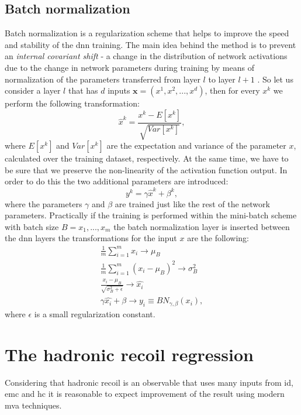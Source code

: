 \subsection{Batch normalization}
Batch normalization is a regularization scheme that helps to improve the speed and stability of the \gls{dnn} training. The main idea behind the method is to prevent an \textit{internal covariant shift} - a change in the distribution of network activations due to the change in network parameters during training by means of normalization of the parameters transferred from layer $l$ to layer $l+1$  \cite{batch_normalization}. So let us consider a layer $l$ that has $d$ inputs $\textbf{x}=(x^1,x^2,...,x^d)$, then for every $x^k$ we perform the following transformation:
\begin{equation}
\label{eq::bn1}
\hat{x}^k=\frac{x^k-E[x^k]}{\sqrt{Var[x^k]}},
\end{equation}
where $E[x^k]$ and $Var[x^k]$ are the expectation and variance of the parameter $x$, calculated over the training dataset, respectively. At the same time, we have to be sure that we preserve the non-linearity of the activation function output. In order to do this the two additional parameters are introduced:
\begin{equation}
\label{eq::bn2}
y^k=\gamma  \hat{x}^k + \beta^k ,
\end{equation}
where the parameters $\gamma$ and $\beta$ are trained just like the rest of the network parameters.
Practically if the training is performed within the mini-batch scheme with batch size $B={x_1,...,x_m}$ the batch normalization layer is inserted between the \gls{dnn} layers the transformations for the input $x$ are the following:
\begin{equation}
\begin{array}{lcl} 
\frac{1}{m}\sum_{i=1}^m x_i \rightarrow \mu_B\\
\frac{1}{m}\sum_{i=1}^m (x_i - \mu_B)^2 \rightarrow \sigma^2_B\\
\frac {x_i-\mu_B}{\sqrt{\sigma_B^2+\epsilon}} \rightarrow \hat{x_i}\\
\gamma \hat{x_i} + \beta \rightarrow y_i \equiv BN_{\gamma,\beta}(x_i),
\end{array}
\end{equation}
where $\epsilon$ is a small regularization constant. 
\section{The hadronic recoil regression }
Considering that hadronic recoil is an observable that uses many inputs from \gls{id}, \gls{emc} and \gls{hc} it is reasonable to expect improvement of the result using modern \gls{mva} techniques. 
